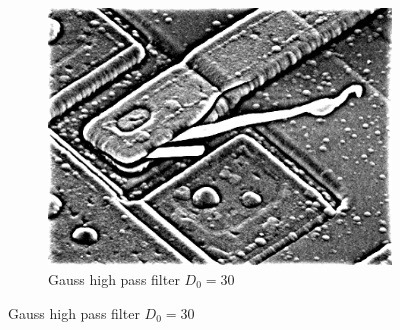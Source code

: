 \documentclass[UTF8]{ctexart}
\begin{document}
\begin{figure}[htbp]
\begin{subfigure}{0.3\textwidth}
        \includegraphics[width=\linewidth]{ic_ghpf.png}
        \caption{Gauss high pass filter $D_0 = 30$}
    \end{subfigure}


\end{figure}
\end{document}
